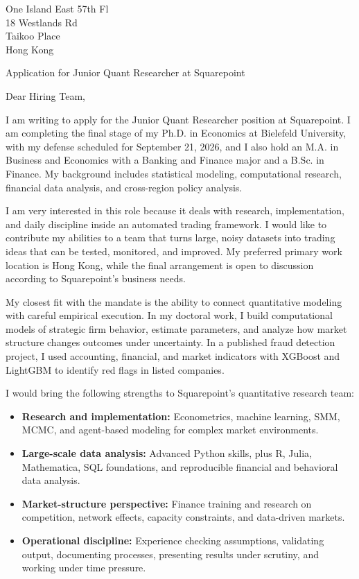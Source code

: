 \documentclass[11pt]{article}
\begin{document}
\vspace{0.1cm}

\noindent
One Island East 57th Fl \\
18 Westlands Rd \\
Taikoo Place \\
Hong Kong

\vspace{0.1cm}

\noindent
Application for Junior Quant Researcher at Squarepoint \\

\vspace{0.05cm}

\noindent Dear Hiring Team,

I am writing to apply for the Junior Quant Researcher position at Squarepoint. 
I am completing the final stage of my Ph.D. in Economics at Bielefeld University, with my defense scheduled for September 21, 2026, 
and I also hold an M.A. in Business and Economics with a Banking and Finance major and a B.Sc. in Finance. 
My background includes statistical modeling, computational research, financial data analysis, 
and cross-region policy analysis.

I am very interested in this role because it deals with research, implementation, 
and daily discipline inside an automated trading framework. 
I would like to contribute my abilities to a team that turns large, noisy datasets into trading ideas that can be tested, monitored, and improved. 
My preferred primary work location is Hong Kong, while the final arrangement is open to discussion according to Squarepoint's business needs.

My closest fit with the mandate is the ability to connect quantitative modeling with careful empirical execution. 
In my doctoral work, I build computational models of strategic firm behavior, estimate parameters, and analyze how market structure changes outcomes under uncertainty. 
In a published fraud detection project, I used accounting, financial, and market indicators with XGBoost and LightGBM to identify red flags in listed companies.

I would bring the following strengths to Squarepoint's quantitative research team:

\begin{itemize}
    \item \textbf{Research and implementation:} Econometrics, machine learning, SMM, MCMC, and agent-based modeling for complex market environments.
    \item \textbf{Large-scale data analysis:} Advanced Python skills, plus R, Julia, Mathematica, SQL foundations, and reproducible financial and behavioral data analysis.
    \item \textbf{Market-structure perspective:} Finance training and research on competition, network effects, capacity constraints, and data-driven markets.
    \item \textbf{Operational discipline:} Experience checking assumptions, validating output, documenting processes, presenting results under scrutiny, and working under time pressure.
\end{itemize}
\end{document}

